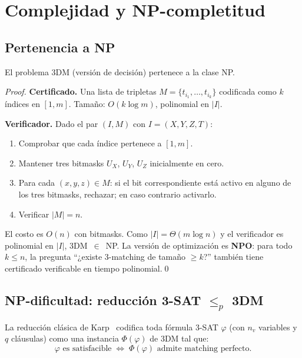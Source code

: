 \section{Complejidad y NP-completitud}
\label{sec:complejidad}

\subsection{Pertenencia a NP}
\label{sec:complejidad:np}

\begin{theorem}[3DM $\in$ NP]
\label{thm:np}
El problema 3DM (versión de decisión) pertenece a la clase NP.
\end{theorem}
\begin{proof}
\textbf{Certificado.} Una lista de tripletas $M=\{t_{i_1},\dots,t_{i_k}\}$
codificada como $k$ índices en $[1,m]$.  Tamaño: $O(k\log m)$, polinomial
en $|I|$.

\textbf{Verificador.}  Dado el par $(I,M)$ con $I=(X,Y,Z,T)$:
\begin{enumerate}
  \item Comprobar que cada índice pertenece a $[1,m]$.
  \item Mantener tres bitmasks $U_X$, $U_Y$, $U_Z$ inicialmente en cero.
  \item Para cada $(x,y,z)\in M$: si el bit correspondiente está activo en
        alguno de los tres bitmasks, rechazar; en caso contrario activarlo.
  \item Verificar $|M|=n$.
\end{enumerate}
El costo es $O(n)$ con bitmasks.  Como $|I|=\Theta(m\log n)$ y el
verificador es polinomial en $|I|$, 3DM~$\in$~NP. La versión de
optimización es \textbf{NPO}:  para todo $k\le n$, la pregunta
``¿existe 3-matching de tamaño $\ge k$?'' también tiene certificado
verificable en tiempo polinomial.\qed
\end{proof}

\subsection{NP-dificultad: reducción 3-SAT \texorpdfstring{$\le_p$}{<=p} 3DM}
\label{sec:complejidad:hard}

La reducción clásica de Karp~\cite{karp1972} codifica toda fórmula 3-SAT
$\varphi$ (con $n_v$ variables y $q$ cláusulas) como una instancia
$\Phi(\varphi)$ de 3DM tal que:
\[
\varphi\text{ es satisfacible}
\;\Longleftrightarrow\;
\Phi(\varphi)\text{ admite matching perfecto.}
\]

